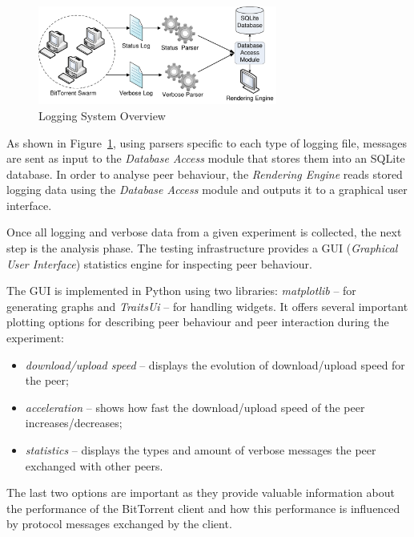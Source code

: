 \begin{figure}[h]
  \begin{center}
    \includegraphics[width=0.7\textwidth]{src/img/proto-measure/logarch-not-use}
  \end{center}
  \caption{Logging System Overview}
  \label{fig:proto-measure:logarch}
\end{figure}

As shown in Figure~\ref{fig:proto-measure:logarch}, using parsers specific to
each type of logging file, messages are sent as input to the \textit{Database
Access} module that stores them into an SQLite database. In order to analyse
peer behaviour, the \textit{Rendering Engine} reads stored logging data using
the \textit{Database Access} module and outputs it to a graphical user
interface.

Once all logging and verbose data from a given experiment is collected, the
next step is the analysis phase. The testing infrastructure provides a GUI
(\textit{Graphical User Interface}) statistics engine for inspecting peer
behaviour.

The GUI is implemented in Python using two libraries: \textit{matplotlib}
-- for generating graphs and \textit{TraitsUi} -- for handling widgets. It
offers several important plotting options for describing peer behaviour and
peer interaction during the experiment:

\begin{itemize}
  \item \textit{download/upload speed} -- displays the evolution of
download/upload speed for the peer;
  \item \textit{acceleration} -- shows how fast the download/upload speed of
the peer increases/decreases;
  \item \textit{statistics} -- displays the types and amount of verbose
messages the peer exchanged with other peers.
\end{itemize}

The last two options are important as they provide valuable information about
the performance of the BitTorrent client and how this performance is
influenced by protocol messages exchanged by the client.

